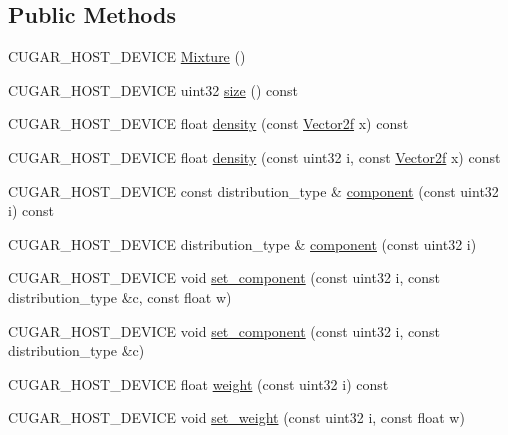 \subsection*{Public Methods}
\begin{DoxyCompactItemize}
\item 
C\+U\+G\+A\+R\+\_\+\+H\+O\+S\+T\+\_\+\+D\+E\+V\+I\+CE \hyperlink{structcugar_1_1_mixture_a5749d6a34b2efbe87df854c09a3cee09}{Mixture} ()
\item 
C\+U\+G\+A\+R\+\_\+\+H\+O\+S\+T\+\_\+\+D\+E\+V\+I\+CE uint32 \hyperlink{structcugar_1_1_mixture_a2e54c53e471a88e775802c2c15804fe5}{size} () const
\item 
C\+U\+G\+A\+R\+\_\+\+H\+O\+S\+T\+\_\+\+D\+E\+V\+I\+CE float \hyperlink{structcugar_1_1_mixture_a8056e27efcefea2005a3b52b8abf751f}{density} (const \hyperlink{structcugar_1_1_vector}{Vector2f} x) const
\item 
C\+U\+G\+A\+R\+\_\+\+H\+O\+S\+T\+\_\+\+D\+E\+V\+I\+CE float \hyperlink{structcugar_1_1_mixture_a1f5002f32c4f8af39983d3b805721007}{density} (const uint32 i, const \hyperlink{structcugar_1_1_vector}{Vector2f} x) const
\item 
C\+U\+G\+A\+R\+\_\+\+H\+O\+S\+T\+\_\+\+D\+E\+V\+I\+CE const distribution\+\_\+type \& \hyperlink{structcugar_1_1_mixture_a9a558f72b8f9e9735942014f2a07c37b}{component} (const uint32 i) const
\item 
C\+U\+G\+A\+R\+\_\+\+H\+O\+S\+T\+\_\+\+D\+E\+V\+I\+CE distribution\+\_\+type \& \hyperlink{structcugar_1_1_mixture_af1cbb67b23fe32e6b1957243b4441ea8}{component} (const uint32 i)
\item 
C\+U\+G\+A\+R\+\_\+\+H\+O\+S\+T\+\_\+\+D\+E\+V\+I\+CE void \hyperlink{structcugar_1_1_mixture_a0f98ea273f18224f1a7376b0967a8104}{set\+\_\+component} (const uint32 i, const distribution\+\_\+type \&c, const float w)
\item 
C\+U\+G\+A\+R\+\_\+\+H\+O\+S\+T\+\_\+\+D\+E\+V\+I\+CE void \hyperlink{structcugar_1_1_mixture_abc1a088191870c698dc314d72a405914}{set\+\_\+component} (const uint32 i, const distribution\+\_\+type \&c)
\item 
C\+U\+G\+A\+R\+\_\+\+H\+O\+S\+T\+\_\+\+D\+E\+V\+I\+CE float \hyperlink{structcugar_1_1_mixture_aca3cf56f710173842eb6fac00415ce79}{weight} (const uint32 i) const
\item 
C\+U\+G\+A\+R\+\_\+\+H\+O\+S\+T\+\_\+\+D\+E\+V\+I\+CE void \hyperlink{structcugar_1_1_mixture_a534c401940e7eb7478eb96107d09a300}{set\+\_\+weight} (const uint32 i, const float w)
\end{DoxyCompactItemize}
